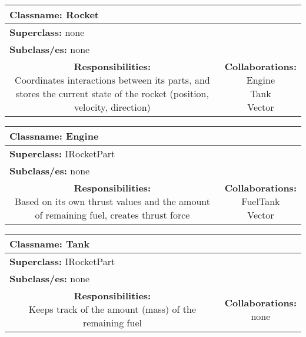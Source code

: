 \documentclass{article}
\begin{document}
\begin {center}

\begin{tabular}{|c|c|}
\hline
\multicolumn{2}{|l|}{\textbf{Classname:} Rocket}\\
\hline
\multicolumn{2}{|l|}{\textbf{Superclass:} none}\\
\multicolumn{2}{|l|}{\textbf{Subclass/es:} none}\\
\hline
\parbox[]{5cm}{\textbf{Responsibilities:} \\Coordinates interactions between its parts, and stores the current state of the rocket (position, velocity, direction)} & \parbox[]{5cm}{\textbf{Collaborations:}\\Engine\\Tank\\Vector}\\
\hline
 \end{tabular}\vspace{.4cm}
 
\begin{tabular}{|c|c|}
\hline
\multicolumn{2}{|l|}{\textbf{Classname:} Engine}\\
\hline
\multicolumn{2}{|l|}{\textbf{Superclass:} IRocketPart}\\
\multicolumn{2}{|l|}{\textbf{Subclass/es:} none}\\
\hline
\parbox[]{5cm}{\textbf{Responsibilities:} \\Based on its own thrust values and the amount of remaining fuel, creates thrust force} & \parbox[]{5cm}{\textbf{Collaborations:}\\FuelTank\\Vector}\\
\hline
 \end{tabular}\vspace{.4cm}

\begin{tabular}{|c|c|}
\hline
\multicolumn{2}{|l|}{\textbf{Classname:} Tank}\\
\hline
\multicolumn{2}{|l|}{\textbf{Superclass:} IRocketPart}\\
\multicolumn{2}{|l|}{\textbf{Subclass/es:} none}\\
\hline
\parbox[]{5cm}{\textbf{Responsibilities:} \\Keeps track of the amount (mass) of the remaining fuel} & \parbox[]{5cm}{\textbf{Collaborations:}\\none}\\
\hline
 \end{tabular}\vspace{.4cm}


\end{center}
\end{document}
